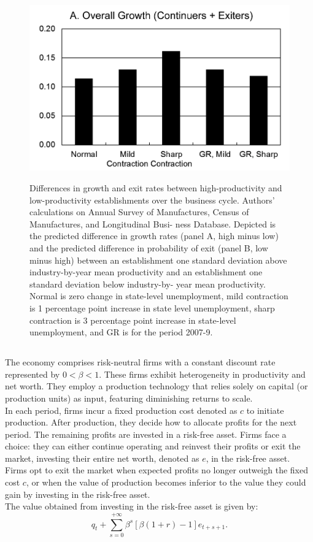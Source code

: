 \documentclass[12pt]{article}
\begin{document}
\begin{figure}
    \centering
    \includegraphics[scale = 0.35]{Plot1.7.png}
    \label{plot:1.7}
    \caption{Differences in growth and exit rates between high-productivity and
    low-productivity establishments over the business cycle. Authors' calculations on
    Annual Survey of Manufactures, Census of Manufactures, and Longitudinal Busi-
    ness Database. Depicted is the predicted difference in growth rates (panel A, high
    minus low) and the predicted difference in probability of exit (panel B, low minus
    high) between an establishment one standard deviation above industry-by-year
    mean productivity and an establishment one standard deviation below industry-by-
    year mean productivity. Normal is zero change in state-level unemployment, mild
    contraction is 1 percentage point increase in state level unemployment, sharp
    contraction is 3 percentage point increase in state-level unemployment, and GR is
    for the period 2007-9.
    }
\end{figure} 
\subsection{\cite{OsePap17}}
The economy comprises risk-neutral firms with a constant discount rate represented by $0 < \beta < 1$. These firms
exhibit heterogeneity in productivity and net worth. They employ a production technology that relies solely on capital
(or production units) as input, featuring diminishing returns to scale.
\\
In each period, firms incur a fixed production cost denoted as $c$ to initiate production. After production, they decide
how to allocate profits for the next period. The remaining profits are invested in a risk-free asset. Firms face a
choice: they can either continue operating and reinvest their profits or exit the market, investing their entire net
worth, denoted as $e$, in the risk-free asset.
\\
Firms opt to exit the market when expected profits no longer outweigh the fixed cost $c$, or when the value of
production becomes inferior to the value they could gain by investing in the risk-free asset.
\\
The value obtained from investing in the risk-free asset is given by:
\[
q_t + \sum_{s=0}^{+\infty}\beta^s[\beta(1+r)-1]e_{t+s+1}.
\]
\end{document}

